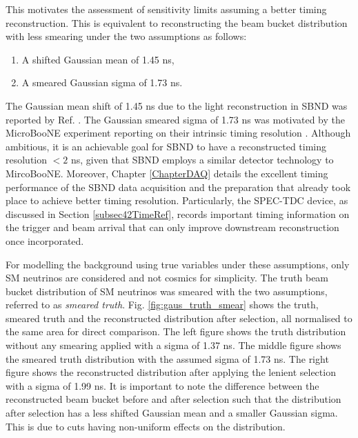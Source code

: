 This motivates the assessment of sensitivity limits assuming a better timing reconstruction.
This is equivalent to reconstructing the beam bucket distribution with less smearing under the two assumptions as follows:
\begin{enumerate}
    \item A shifted Gaussian mean of 1.45 ns,
    \item A smeared Gaussian sigma of 1.73 ns.
\end{enumerate}
The Gaussian mean shift of 1.45 ns due to the light reconstruction in SBND was reported by Ref. \cite{sbnd_pds_paper}.
The Gaussian smeared sigma of 1.73 ns was motivated by the MicroBooNE experiment reporting on their intrinsic timing resolution \cite{uboone_ns}.
Although ambitious, it is an achievable goal for SBND to have a reconstructed timing resolution $< 2$ ns, given that SBND employs a similar detector technology to MircoBooNE.
Moreover, Chapter \ref{ChapterDAQ} details the excellent timing performance of the SBND data acquisition and the preparation that already took place to achieve better timing resolution.
Particularly, the SPEC-TDC device, as discussed in Section \ref{subsec42TimeRef}, records important timing information on the trigger and beam arrival that can only improve downstream reconstruction once incorporated. 

For modelling the background using true variables under these assumptions, only SM neutrinos are considered and not cosmics for simplicity. 
The truth beam bucket distribution of SM neutrinos was smeared with the two assumptions, referred to as \textit{smeared truth}.
Fig. \ref{fig:gaus_truth_smear} shows the truth, smeared truth and the reconstructed distribution after selection, all normalised to the same area for direct comparison.
The left figure shows the truth distribution without any smearing applied with a sigma of 1.37 ns.
The middle figure shows the smeared truth distribution with the assumed sigma of 1.73 ns.
The right figure shows the reconstructed distribution after applying the lenient selection with a sigma of 1.99 ns.
It is important to note the difference between the reconstructed beam bucket before and after selection such that the distribution after selection has a less shifted Gaussian mean and a smaller Gaussian sigma.
This is due to cuts having non-uniform effects on the distribution. 

